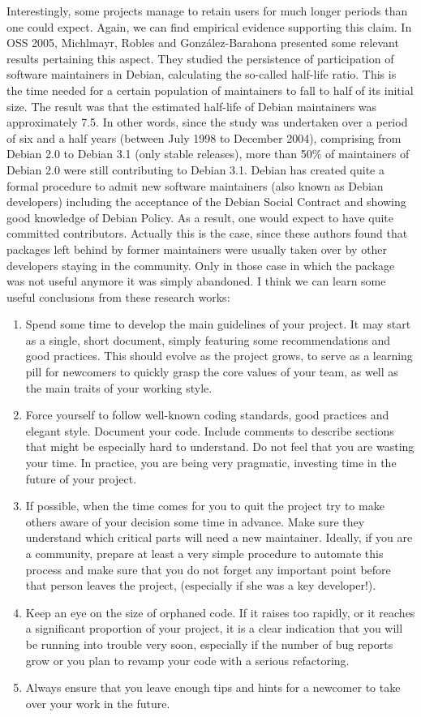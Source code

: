 Interestingly, some projects manage to retain users for much longer periods than one could expect. Again, we can find empirical evidence supporting this claim. In OSS 2005, Michlmayr, Robles and González-Barahona presented some relevant results pertaining this aspect. They studied the persistence of participation of software maintainers in Debian, calculating the so-called half-life ratio. This is the time needed for a certain population of maintainers to fall to half of its initial size. The result was that the estimated half-life of Debian maintainers was approximately 7.5. In other words, since the study was undertaken over a period of six and a half years (between July 1998 to December 2004), comprising from Debian 2.0 to Debian 3.1 (only stable releases), more than 50\% of maintainers of Debian 2.0 were still contributing to Debian 3.1.
Debian has created quite a formal procedure to admit new software maintainers (also known as Debian developers) including the acceptance of the Debian Social Contract and showing good knowledge of Debian Policy. As a result, one would expect to have quite committed contributors. Actually this is the case, since these authors found that packages left behind by former maintainers were usually taken over by other developers staying in the community. Only in those case in which the package was not useful anymore it was simply abandoned.
I think we can learn some useful conclusions from these research works:
\begin{enumerate}
 \item Spend some time to develop the main guidelines of your project. It may start as a single, short document, simply featuring some recommendations and good practices. This should evolve as the project grows, to serve as a learning pill for newcomers to quickly grasp the core values of your team, as well as the main traits of your working style.
 \item Force yourself to follow well-known coding standards, good practices and elegant style. Document your code. Include comments to describe sections that might be especially hard to understand. Do not feel that you are wasting your time. In practice, you are being very pragmatic, investing time in the future of your project.
 \item If possible, when the time comes for you to quit the project try to make others aware of your decision some time in advance. Make sure they understand which critical parts will need a new maintainer. Ideally, if you are a community, prepare at least a very simple procedure to automate this process and make sure that you do not forget any important point before that person leaves the project, (especially if she was a key developer!).
 \item Keep an eye on the size of orphaned code. If it raises too rapidly, or it reaches a significant proportion of your project, it is a clear indication that you will be running into trouble very soon, especially if the number of bug reports grow or you plan to revamp your code with a serious refactoring.
 \item Always ensure that you leave enough tips and hints for a newcomer to take over your work in the future.
\end{enumerate}

